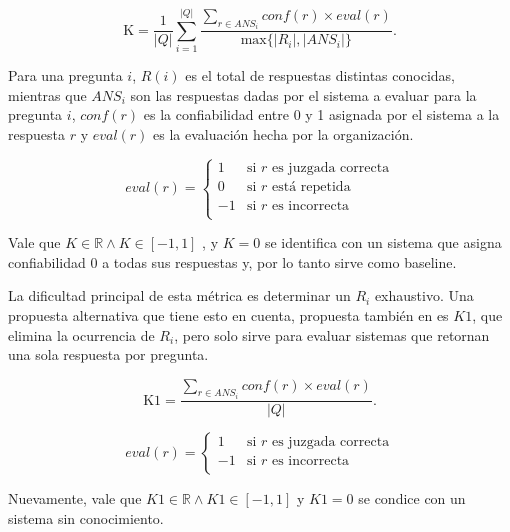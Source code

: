 \begin{equation}\label{eq:k}
 \text{K} = \frac{1}{|Q|} \sum_{i=1}^{|Q|} \frac{\sum_{r \in ANS_i} conf(r) \times eval(r)}{\text{max}\{|R_i|, |ANS_i|\}}. \!
\end{equation}

Para una pregunta $i$, $R(i)$ es el total de respuestas distintas conocidas, mientras que $ANS_i$ son las respuestas dadas por el sistema a evaluar para la pregunta $i$, $conf(r)$ es la confiabilidad entre 0 y 1 asignada por el sistema a la respuesta $r$ y $eval(r)$ es la evaluación hecha por la organización.


\begin{equation*}
    eval(r) = \begin{cases}
               1  & \text{si $r$ es juzgada correcta}\\
               0  & \text{si $r$ está repetida}\\
               -1 & \text{si $r$ es incorrecta}\\
           \end{cases}
\end{equation*}

Vale que $K \in \mathbb{R} \wedge  K \in [-1,1]$ , y $K=0$ se identifica con un sistema que asigna confiabilidad 0 a todas sus respuestas y, por lo tanto sirve como baseline. 

La dificultad principal de esta métrica es determinar un $R_i$ exhaustivo. Una propuesta alternativa que tiene esto en cuenta, propuesta también en \cite{CLEF04} es $K1$, que elimina la ocurrencia de $R_i$, pero solo sirve para evaluar sistemas que retornan una sola respuesta por pregunta.

\begin{equation}\label{eq:k1}
 \text{K1} = \frac{\sum_{r \in ANS_i} conf(r) \times eval(r)}{|Q|}. \!
\end{equation}

\begin{equation*}
    eval(r) = \begin{cases}
               1  & \text{si $r$ es juzgada correcta}\\
               -1 & \text{si $r$ es incorrecta}\\
           \end{cases}
\end{equation*}

Nuevamente, vale que $K1 \in \mathbb{R} \wedge  K1 \in [-1,1]$ y $K1=0$ se condice con un sistema sin conocimiento.


